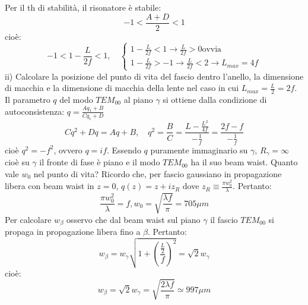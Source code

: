 \documentclass{book}
\def \l {\lambda}
\theoremstyle{remark}
\begin{document}
Per il th di stabilità, il risonatore è stabile:
\begin{equation*}
-1 < \frac{A+D}{2} < 1
\end{equation*}
cioè:
\begin{equation*}
-1 < 1-\frac{L}{2f} < 1, \quad \begin{cases}
1 - \frac{L}{2f} < 1 \rightarrow \frac{L}{2f} > 0 \text{ovvia}\\
1-\frac{L}{2f} > -1 \rightarrow \frac{L}{2f} < 2 \rightarrow L_{max} =4f
\end{cases}
\end{equation*}
ii) Calcolare la posizione del punto di vita del fascio dentro l'anello, la dimensione di macchia e la dimensione di macchia della lente nel caso in cui $L_{max} = \frac{L}{2} = 2f$.
Il parametro $q$ del modo $TEM_00$ al piano $\gamma$ si ottiene dalla condizione di autoconsistenza: $q = \frac{Aq_1 + B}{Cq_1 + D}$
\begin{equation*}
Cq^2 + Dq = Aq + B, \quad q^2=\frac{B}{C} = \frac{L - \frac{L^2}{4f}}{-\frac{1}{f}} = \frac{2f - f}{-\frac{1}{f}}
\end{equation*}
cioè $q^2 = -f^2$, ovvero $q = if$.
Essendo $q$ puramente immaginario su $\gamma$, $R_\gamma=\infty$ cioè su $\gamma$ il fronte di fase è piano e il modo $TEM_{00}$ ha il suo beam waist. Quanto vale $w_0$ nel punto di vita? Ricordo che, per fascio gaussiano in propagazione libera con beam waist in $z=0$, $q(z) = z +iz_R$ dove $z_R \equiv \frac{\pi w_0^2}{\l}$. Pertanto:
\begin{equation*}
\frac{\pi w_0^2}{\l} = f, w_0 = \sqrt{\frac{\l f}{\pi}} = 705 \mu m
\end{equation*}
Per calcolare $w_\beta$ osservo che dal beam waist sul piano $\gamma$ il fascio $TEM_{00}$ si propaga in propagazione libera fino a $\beta$. Pertanto:
\begin{equation*}
w_\beta = w_\gamma \sqrt{1+ \left(\frac{\frac{L}{2}}{f}\right)^2} = \sqrt{2}w_\gamma
\end{equation*}
cioè:
\begin{equation*}
w_\beta = \sqrt{2}w_\gamma = \sqrt{\frac{2\l f}{\pi}} \simeq 997 \mu m
\end{equation*}
\end{document}
